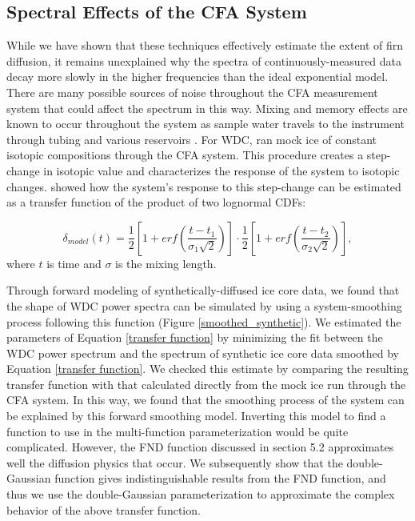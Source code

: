 \documentclass[draft, jgrga]{AGUTeX}
\begin{document}
\begin{article}
\subsection{Spectral Effects of the CFA System}
While we have shown that these techniques effectively estimate the extent of firn diffusion, it remains unexplained why the spectra of continuously-measured data decay more slowly in the higher frequencies than the ideal exponential model. There are many possible sources of noise throughout the CFA measurement system that could affect the spectrum in this way. Mixing and memory effects are known to occur throughout the system as sample water travels to the instrument through tubing and various reservoirs \citep{Gkinis2011a}. For WDC, \citet{Jones2017b} ran mock ice of constant isotopic compositions through the CFA system. This procedure creates a step-change in isotopic value and characterizes the response of the system to isotopic changes. \citep{Jones2017b} showed how the system's response to this step-change can be estimated as a transfer function of the product of two lognormal CDFs:

\begin{equation}
  \label{transfer function}
  \delta_{model}(t) = \frac{1}{2}\left[1+erf\left(\frac{t-t_1}{\sigma_1\sqrt{2}}\right)\right] \cdot \frac{1}{2}\left[1+erf\left(\frac{t-t_2}{\sigma_2\sqrt{2}}\right)\right],
\end{equation}
where $t$ is time and $\sigma$ is the mixing length.

Through forward modeling of synthetically-diffused ice core data, we found that the shape of WDC power spectra can be simulated by using a system-smoothing process following this function (Figure \ref{smoothed_synthetic}). We estimated the parameters of Equation \ref{transfer function} by minimizing the fit between the WDC power spectrum and the spectrum of synthetic ice core data smoothed by Equation \ref{transfer function}. We checked this estimate by comparing the resulting transfer function with that calculated directly from the mock ice run through the CFA system. In this way, we found that the smoothing process of the system can be explained by this forward smoothing model. Inverting this model to find a function to use in the multi-function parameterization would be quite complicated. However, the FND function discussed in section 5.2 approximates well the diffusion physics that occur. We subsequently show that the double-Gaussian function gives indistinguishable results from the FND function, and thus we use the double-Gaussian parameterization to approximate the complex behavior of the above transfer function.


\end{article}
\end{document}
